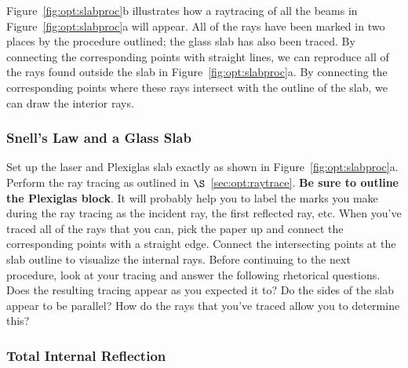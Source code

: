 \noindent Figure~\ref{fig:opt:slabproc}b illustrates how a raytracing of all the beams
in  Figure~\ref{fig:opt:slabproc}a will appear.  All of the rays have been 
marked in two places by the procedure outlined; the glass slab has also been
traced.  By connecting the corresponding points with straight lines, we can
reproduce all of the rays found outside the slab in 
Figure~\ref{fig:opt:slabproc}a. By connecting the corresponding points where 
these rays intersect with the outline of the slab, we can draw the interior 
rays.


\subsubsection{Snell's Law and a Glass Slab}

Set up the laser and Plexiglas slab exactly as shown in 
Figure~\ref{fig:opt:slabproc}a.  Perform the ray tracing as outlined in 
$\S$~\ref{sec:opt:raytrace}. {\bf Be sure to outline the Plexiglas block}. 
It will 
probably help you to label the marks you make during the ray tracing as the 
incident ray, the first reflected ray, etc. When you've traced all of the rays 
that you can, pick the paper up and connect the corresponding points with a 
straight edge.  Connect the intersecting points at the slab outline to 
visualize the internal rays. Before continuing to the next procedure,
look at your tracing and answer the following rhetorical questions.
Does the resulting tracing appear as you expected 
it to?  Do the sides of the slab appear to be parallel? How do the rays that 
you've traced allow you to determine this?  \\
 

\subsubsection{Total Internal Reflection}

